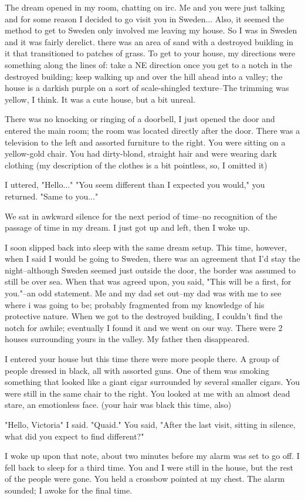 The dream opened in my room, chatting on irc.  Me and you were just talking and for some reason I decided to go visit you in Sweden... Also, it seemed the method to get to Sweden only involved me leaving my house.  So I was in Sweden and it was fairly derelict.  there was an area of sand with a destroyed building in it that transitioned to patches of grass.  To get to your house, my directions were something along the lines of: take a NE direction once you get to a notch in the destroyed building; keep walking up and over the hill ahead into a valley; the house is a darkish purple on a sort of scale-shingled texture--The trimming was yellow, I think. It was a cute house, but a bit unreal.

There was no knocking or ringing of a doorbell, I just opened the door and entered the main room; the room was located directly after the door. There was a television to the left and assorted furniture to the right.  You were sitting on a yellow-gold chair. You had dirty-blond, straight hair and were wearing dark clothing (my description of the clothes is a bit pointless, so, I omitted it)

I uttered, "Hello..."
"You seem different than I expected you would," you returned.
"Same to you..."

We sat in awkward silence for the next period of time--no recognition of the passage of time in my dream. I just got up and left, then I woke up.

I soon slipped back into sleep with the same dream setup.  This time, however, when I said I would be going to Sweden, there was an agreement that I'd stay the night--although Sweden seemed just outside the door, the border was assumed to still be over sea. When that was agreed upon, you said, "This will be a first, for you."--an odd statement. Me and my dad set out--my dad was with me to see where i was going to be; probably fragmented from my knowledge of his protective nature. When we got to the destroyed building, I couldn't find the notch for awhile; eventually I found it and we went on our way.  There were 2 houses surrounding yours in the valley. My father then disappeared.

 I entered your house but this time there were more people there. A group of people dressed in black, all with assorted guns. One of them was smoking something that looked like a giant cigar surrounded by several smaller cigars. You were still in the same chair to the right.  You looked at me with an almost dead stare, an emotionless face. (your hair was black this time, also)

"Hello, Victoria" I said.  
"Quaid." You said, "After the last visit, sitting in silence, what did you expect to find different?"

I woke up upon that note, about two minutes before my alarm was set to go off.  I fell back to sleep for a third time. You and I were still in the house, but the rest of the people were gone. You held a crossbow pointed at my chest.  The alarm sounded; I awoke for the final time.
